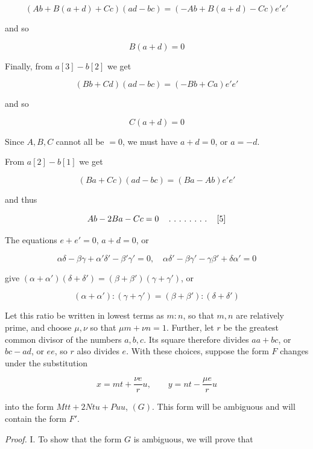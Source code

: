 
\[
(Ab+B(a+d)+Cc)(ad-bc)=(-Ab+B(a+d)-Cc)e'e'
\]

and so

\[
B(a+d)=0
\]

Finally, from $a[3]-b[2]$ we get

\[
(Bb+Cd)(ad-bc)=(-Bb+Ca)e'e'
\]

and so

\[
C(a+d)=0
\]

Since $A,B,C$ cannot all be $=0$, we must have $a+d=0$, or $a=-d$.

From $a[2]-b[1]$ we get

\[
(Ba+Cc)(ad-bc)=(Ba-Ab)e'e'
\]

and thus

\[
Ab-2Ba-Cc=0\quad\mathinner{.\ .\ .\ .\ .\ .\ .\ .}\quad[5]
\]

The equations $e+e'=0$, $a+d=0$, or

\[
\alpha\delta-\beta\gamma+\alpha'\delta'-\beta'\gamma'=0,\quad\alpha\delta'-\beta\gamma'-\gamma\beta'+\delta\alpha'=0
\]

give $(\alpha+\alpha')(\delta+\delta')=(\beta+\beta')(\gamma+\gamma')$, or

\[
(\alpha+\alpha'):(\gamma+\gamma')=(\beta+\beta'):(\delta+\delta')
\]

Let this ratio be written in lowest terms as $m:n$, so that $m,n$ are relatively prime, and choose $\mu,\nu$ so that $\mu m+\nu n=1$. Further, let $r$ be the greatest common divisor of the numbers $a,b,c$. Its square therefore divides $aa+bc$, or $bc-ad$, or $ee$, so $r$ also divides $e$. With these choices, suppose the form $F$ changes under the substitution

\[
x=mt+\frac{\nu e}{r}u,\qquad y=nt-\frac{\mu e}{r}u
\]

into the form $Mtt+2Ntu+Puu$, $(G)$. This form will be ambiguous and will contain the form $F'$.


\emph{Proof.} I. To show that the form $G$ is ambiguous, we will prove that

